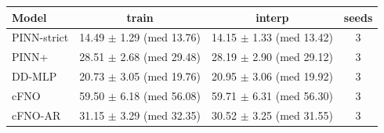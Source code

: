 \begin{tabular}{lccc}
\toprule
Model & train & interp & seeds \\
\midrule
PINN-strict & 14.49 $\pm$ 1.29 (med 13.76) & 14.15 $\pm$ 1.33 (med 13.42) & 3 \\
PINN+ & 28.51 $\pm$ 2.68 (med 29.48) & 28.19 $\pm$ 2.90 (med 29.12) & 3 \\
DD-MLP & 20.73 $\pm$ 3.05 (med 19.76) & 20.95 $\pm$ 3.06 (med 19.92) & 3 \\
cFNO & 59.50 $\pm$ 6.18 (med 56.08) & 59.71 $\pm$ 6.31 (med 56.30) & 3 \\
cFNO-AR & 31.15 $\pm$ 3.29 (med 32.35) & 30.52 $\pm$ 3.25 (med 31.55) & 3 \\
\bottomrule
\end{tabular}
